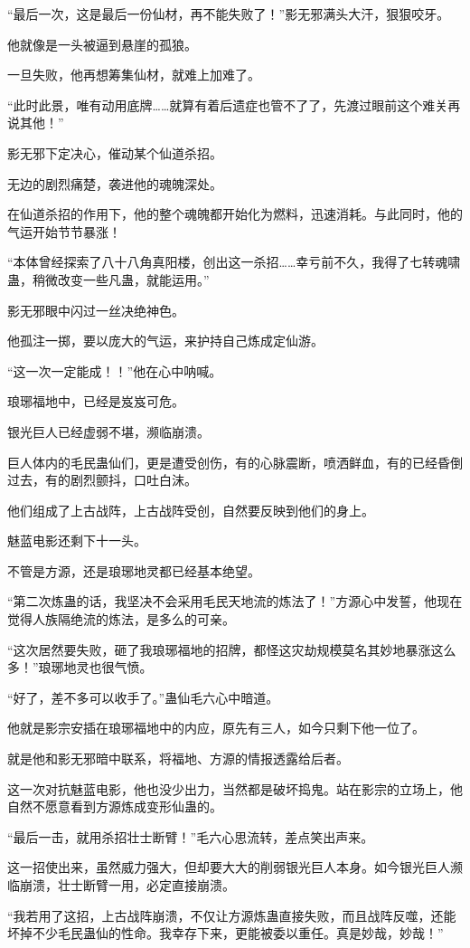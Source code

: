 \begin{this_body}
“最后一次，这是最后一份仙材，再不能失败了！”影无邪满头大汗，狠狠咬牙。

他就像是一头被逼到悬崖的孤狼。

一旦失败，他再想筹集仙材，就难上加难了。

“此时此景，唯有动用底牌……就算有着后遗症也管不了了，先渡过眼前这个难关再说其他！”

影无邪下定决心，催动某个仙道杀招。

无边的剧烈痛楚，袭进他的魂魄深处。

在仙道杀招的作用下，他的整个魂魄都开始化为燃料，迅速消耗。与此同时，他的气运开始节节暴涨！

“本体曾经探索了八十八角真阳楼，创出这一杀招……幸亏前不久，我得了七转魂啸蛊，稍微改变一些凡蛊，就能运用。”

影无邪眼中闪过一丝决绝神色。

他孤注一掷，要以庞大的气运，来护持自己炼成定仙游。

“这一次一定能成！！”他在心中呐喊。

琅琊福地中，已经是岌岌可危。

银光巨人已经虚弱不堪，濒临崩溃。

巨人体内的毛民蛊仙们，更是遭受创伤，有的心脉震断，喷洒鲜血，有的已经昏倒过去，有的剧烈颤抖，口吐白沫。

他们组成了上古战阵，上古战阵受创，自然要反映到他们的身上。

魅蓝电影还剩下十一头。

不管是方源，还是琅琊地灵都已经基本绝望。

“第二次炼蛊的话，我坚决不会采用毛民天地流的炼法了！”方源心中发誓，他现在觉得人族隔绝流的炼法，是多么的可亲。

“这次居然要失败，砸了我琅琊福地的招牌，都怪这灾劫规模莫名其妙地暴涨这么多！”琅琊地灵也很气愤。

“好了，差不多可以收手了。”蛊仙毛六心中暗道。

他就是影宗安插在琅琊福地中的内应，原先有三人，如今只剩下他一位了。

就是他和影无邪暗中联系，将福地、方源的情报透露给后者。

这一次对抗魅蓝电影，他也没少出力，当然都是破坏捣鬼。站在影宗的立场上，他自然不愿意看到方源炼成变形仙蛊的。

“最后一击，就用杀招壮士断臂！”毛六心思流转，差点笑出声来。

这一招使出来，虽然威力强大，但却要大大的削弱银光巨人本身。如今银光巨人濒临崩溃，壮士断臂一用，必定直接崩溃。

“我若用了这招，上古战阵崩溃，不仅让方源炼蛊直接失败，而且战阵反噬，还能坏掉不少毛民蛊仙的性命。我幸存下来，更能被委以重任。真是妙哉，妙哉！”


\end{this_body}
